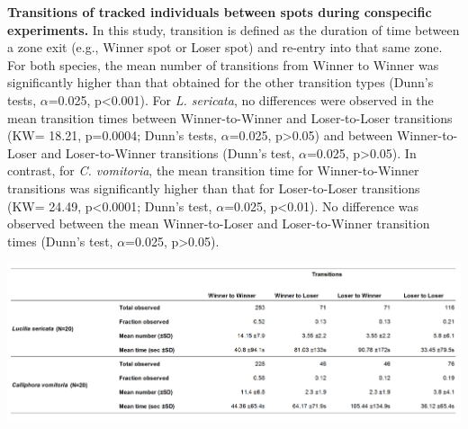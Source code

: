 \begin{landscape}
\begin{table}[t]
	\caption[Transition]{\textbf{Transitions of tracked individuals between spots during conspecific experiments.} In this study, transition is defined as the duration of time between a zone exit (e.g., Winner spot or Loser spot) and re-entry into that same zone. For both species, the mean number of transitions from Winner to Winner was significantly higher than that obtained for the other transition types (Dunn’s tests, $\alpha$=0.025, p<0.001). For \textit{L. sericata}, no differences were observed in the mean transition times between Winner-to-Winner and Loser-to-Loser transitions (KW= 18.21, p=0.0004; Dunn’s tests, $\alpha$=0.025, p>0.05) and between Winner-to-Loser and Loser-to-Winner transitions (Dunn’s test, $\alpha$=0.025, p>0.05). In contrast, for \textit{C. vomitoria}, the mean transition time for Winner-to-Winner transitions was significantly higher than that for Loser-to-Loser transitions (KW= 24.49, p<0.0001; Dunn’s test, $\alpha$=0.025, p<0.01). No difference was observed between the mean Winner-to-Loser and Loser-to-Winner transition times (Dunn’s test, $\alpha$=0.025, p>0.05).}
    \centering
	\includegraphics[width=1.5 \textwidth]{Figures/table2.png}
		\label{tab:transition}
\end{table}
\end{landscape}    

\clearpage    
    
    
    
    
    
    
    
    
    
    
